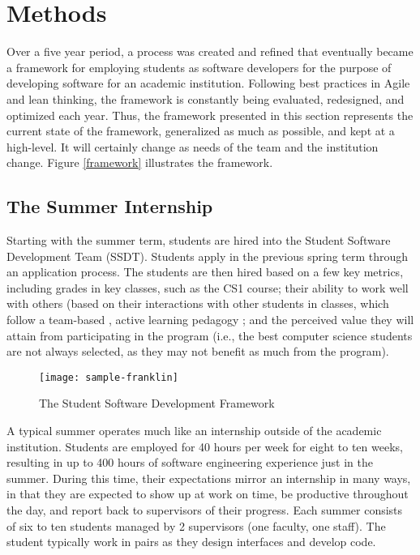 \section{Methods}
Over a five year period, a process was created and refined that eventually became a framework for employing students as software developers for the purpose of developing software for an academic institution. Following best practices in Agile and lean thinking, the framework is constantly being evaluated, redesigned, and optimized each year. Thus, the framework presented in this section represents the current state of the framework, generalized as much as possible, and kept at a high-level. It will certainly change as needs of the team and the institution change. Figure \ref{framework} illustrates the framework. 

\subsection{The Summer Internship}
Starting with the summer term, students are hired into the Student Software Development Team (SSDT). Students apply in the previous spring term through an application process. The students are then hired based on a few key metrics, including grades in key classes, such as the CS1 course; their ability to work well with others (based on their interactions with other students in classes, which follow a team-based \cite{2002PairProgramming}, active learning pedagogy \cite{2012Pogil}; and the perceived value they will attain from participating in the program (i.e., the best computer science students are not always selected, as they may not benefit as much from the program). 

\begin{figure}[h]
  \centering
  \texttt{[image: sample-franklin]}
  \caption{The Student Software Development Framework}
\end{figure}

A typical summer operates much like an internship outside of the academic institution. Students are employed for 40 hours per week for eight to ten weeks, resulting in up to 400 hours of software engineering experience just in the summer. During this time, their expectations mirror an internship in many ways, in that they are expected to show up at work on time, be productive throughout the day, and report back to supervisors of their progress. Each summer consists of six to ten students managed by 2 supervisors (one faculty, one staff). The student typically work in pairs as they design interfaces and develop code. 

